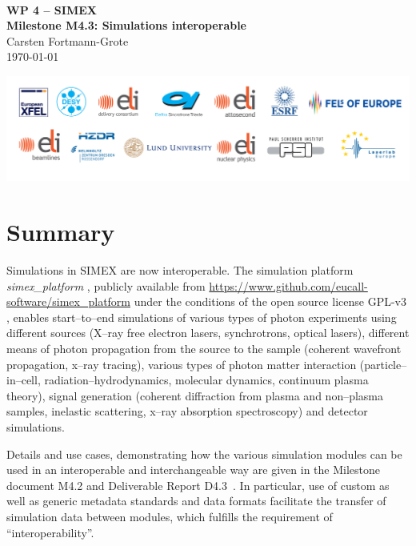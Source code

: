 \documentclass[10pt]{scrartcl}
\begin{document}
\makeatletter
\begin{titlepage}
\thispagestyle{scrheadings}
\begin{center}
  $~$\\
  \vspace{2cm}
  \Huge{\textbf{WP 4 -- SIMEX\\[1cm]
    Milestone M4.3: Simulations interoperable%
  }}\\
  \vspace{2cm}
  \large{%
    Carsten Fortmann-Grote
  }\\[1cm]
  \today
\end{center}
\vfill%
\includegraphics[width=\textwidth]{figures/PartnerLogos_2017}
\end{titlepage}
\makeatother


\section{Summary}
%
Simulations in SIMEX are now interoperable. The simulation platform
\textit{simex\_platform}
\cite{Fortmann-Grote2016b,Fortmann-Grote2017a,simex_github}, publicly available from \href{https://www.github.com/eucall-software/simex_platform}{https://www.github.com/eucall-software/simex\_platform} under the conditions of the open source license GPL-v3 \cite{gplv3}, enables start--to--end simulations of various types of photon experiments using
different sources (X--ray free electron lasers, synchrotrons, optical lasers),
different means of photon propagation from the source to the sample (coherent
wavefront propagation, x--ray tracing), various types of photon matter
interaction (particle--in--cell, radiation--hydrodynamics, molecular dynamics,
continuum plasma theory), signal generation (coherent diffraction from plasma
and non--plasma samples, inelastic scattering, x--ray absorption spectroscopy)
and detector simulations.

Details and use cases, demonstrating how the various
simulation modules can be used in an interoperable and interchangeable way are
given in the Milestone document M4.2 \cite{EUCALL_SIMEX_M4.2} and Deliverable
Report D4.3~\cite{EUCALL_SIMEX_D4.3}. In particular, use of custom as well as generic
metadata standards and data formats facilitate the transfer of simulation data
between modules, which fulfills the requirement of ``interoperability''.
\end{document}
